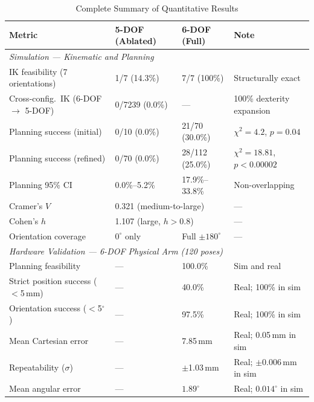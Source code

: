 \documentclass[conference]{IEEEtran}
\begin{document}
	\begin{table}[t]
		\centering
		\caption{Complete Summary of Quantitative Results}
		\label{tab:summary}
		\renewcommand{\arraystretch}{1.3}
		\small
		\begin{tabular}{llll}
			\toprule
			\textbf{Metric} & \textbf{5-DOF (Ablated)} & \textbf{6-DOF (Full)} & \textbf{Note} \\
			\midrule
			\multicolumn{4}{l}{\textit{Simulation — Kinematic and Planning}} \\
			IK feasibility (7 orientations)             & 1/7 (14.3\%)    & 7/7 (100\%)          & Structurally exact \\
			Cross-config.\ IK (6-DOF $\to$ 5-DOF)      & 0/7239 (0.0\%)  & ---                  & 100\% dexterity expansion \\
			Planning success (initial)                  & 0/10 (0.0\%)    & 21/70 (30.0\%)       & $\chi^2=4.2$, $p=0.04$ \\
			Planning success (refined)                  & 0/70 (0.0\%)    & 28/112 (25.0\%)      & $\chi^2=18.81$, $p<0.00002$ \\
			Planning 95\% CI                            & 0.0\%--5.2\%    & 17.9\%--33.8\%       & Non-overlapping \\
			Cramer's $V$                                & \multicolumn{2}{l}{0.321 (medium-to-large)} & --- \\
			Cohen's $h$                                 & \multicolumn{2}{l}{1.107 (large, $h>0.8$)}  & --- \\
			Orientation coverage                        & $0^\circ$ only  & Full $\pm180^\circ$  & --- \\
			\midrule
			\multicolumn{4}{l}{\textit{Hardware Validation — 6-DOF Physical Arm (120 poses)}} \\
			Planning feasibility                        & ---  & 100.0\%       & Sim and real \\
			Strict position success ($<$5\,mm)          & ---  & 40.0\%        & Real; 100\% in sim \\
			Orientation success ($<$5$^\circ$)          & ---  & 97.5\%        & Real; 100\% in sim \\
			Mean Cartesian error                        & ---  & 7.85\,mm      & Real; 0.05\,mm in sim \\
			Repeatability ($\sigma$)                    & ---  & $\pm$1.03\,mm & Real; $\pm$0.006\,mm in sim \\
			Mean angular error                          & ---  & $1.89^\circ$  & Real; $0.014^\circ$ in sim \\
			\bottomrule
		\end{tabular}
	\end{table}
	
\end{document}
